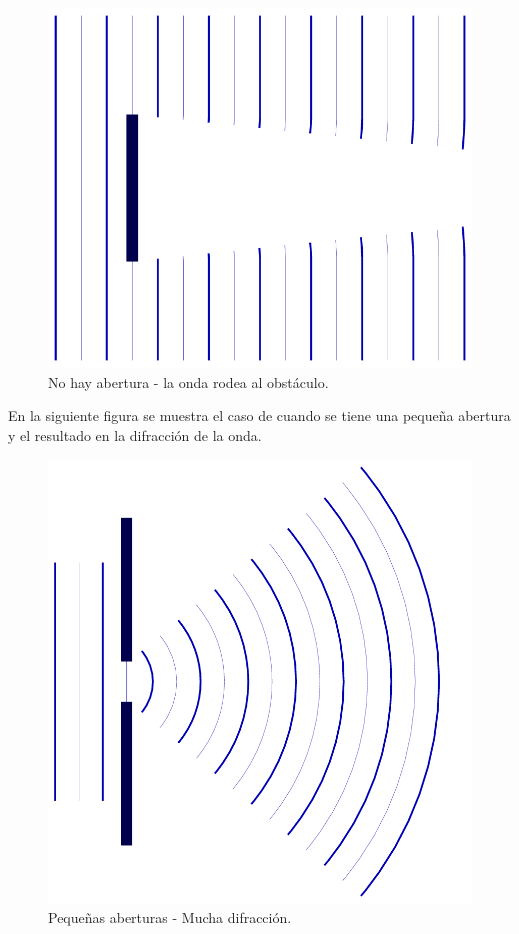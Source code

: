 \documentclass[12pt, letter]{article}
\begin{document}
\begin{figure}[H]
    \centering
    \includegraphics[scale=0.25]{Imagenes/Difraccion_Patrones_02.png}
    \caption{No hay abertura - la onda rodea al obstáculo.}
\end{figure}
En la siguiente figura se muestra el caso de cuando se tiene una pequeña abertura y el resultado en la difracción de la onda.
\begin{figure}[H]
    \centering
    \includegraphics[scale=0.15]{Imagenes/Difraccion_Patrones_03.png}
    \caption{Pequeñas aberturas - Mucha difracción.}
\end{figure}
\end{document}
